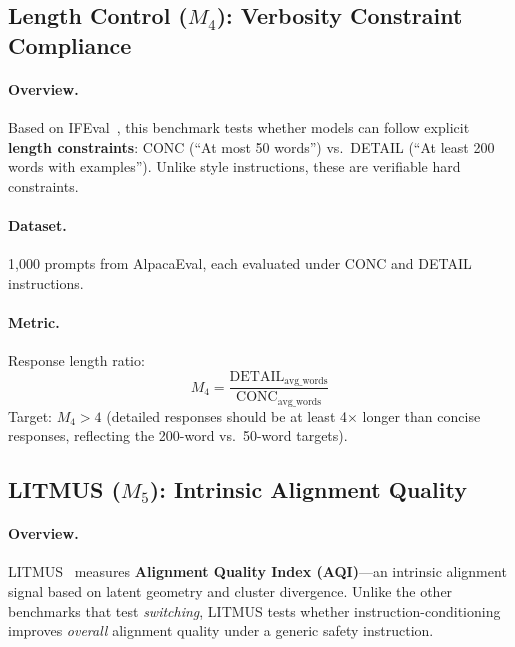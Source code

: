 \subsection{Length Control ($M_4$): Verbosity Constraint Compliance}
\label{sec:appendix_length_control}

\paragraph{Overview.} Based on IFEval~\cite{zhou2023ifeval}, this benchmark tests whether models can follow explicit \textbf{length constraints}: CONC (``At most 50 words'') vs.\ DETAIL (``At least 200 words with examples''). Unlike style instructions, these are verifiable hard constraints.

\paragraph{Dataset.} 1,000 prompts from AlpacaEval, each evaluated under CONC and DETAIL instructions.

\paragraph{Metric.} Response length ratio:
\begin{equation}
    M_4 = \frac{\text{DETAIL}_{\text{avg\_words}}}{\text{CONC}_{\text{avg\_words}}}
\end{equation}
Target: $M_4 > 4$ (detailed responses should be at least 4$\times$ longer than concise responses, reflecting the 200-word vs.\ 50-word targets).

\subsection{LITMUS ($M_5$): Intrinsic Alignment Quality}
\label{sec:appendix_litmus}

\paragraph{Overview.} LITMUS~\cite{borah-etal-2025-alignment} measures \textbf{Alignment Quality Index (AQI)}---an intrinsic alignment signal based on latent geometry and cluster divergence. Unlike the other benchmarks that test \emph{switching}, LITMUS tests whether instruction-conditioning improves \emph{overall} alignment quality under a generic safety instruction.

